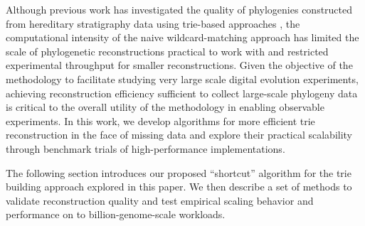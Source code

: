 Although previous work has investigated the quality of phylogenies constructed from hereditary stratigraphy data using trie-based approaches \citep{moreno2025testing}, the computational intensity of the naive wildcard-matching approach has limited the scale of phylogenetic reconstructions practical to work with and restricted experimental throughput for smaller reconstructions.
Given the objective of the methodology to facilitate studying very large scale digital evolution experiments, achieving reconstruction efficiency sufficient to collect large-scale phylogeny data is critical to the overall utility of the methodology in enabling observable experiments.
In this work, we develop algorithms for more efficient trie reconstruction in the face of missing data and explore their practical scalability through benchmark trials of high-performance implementations.

The following section introduces our proposed ``shortcut'' algorithm for the trie building approach explored in this paper. We then describe a set of methods to validate reconstruction quality and test empirical scaling behavior and performance on to billion-genome-scale workloads.

% 





